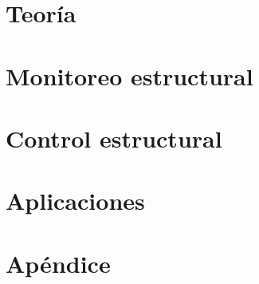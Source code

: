 








\tableofcontents

\newpage


\part{Teoría}







\part{Monitoreo estructural}







\part{Control estructural}







\part{Aplicaciones}



\part*{Apéndice}





